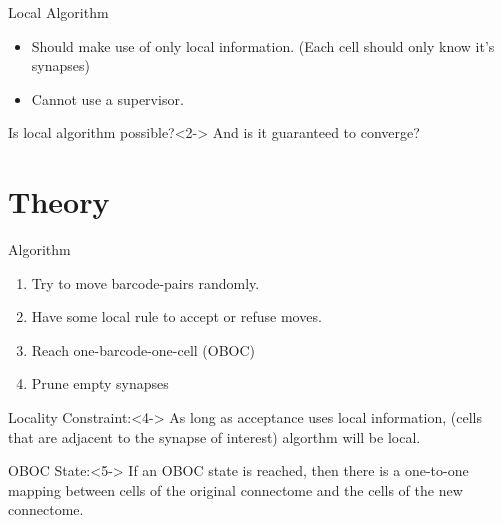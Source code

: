 \documentclass[10pt]{beamer}
\begin{document}
\begin{frame}[fragile]{Local Algorithm}
    \begin{itemize}
        \item Should make use of only local information. (Each cell should only know it's synapses)
        \item Cannot use a supervisor.
    \end{itemize}
    \begin{exampleblock}{\centering Is local algorithm possible?}<2->
        \centering
        And is it guaranteed to converge?
    \end{exampleblock}
\end{frame}




\section{Theory}

\begin{frame}[fragile]{Algorithm}
    \begin{enumerate}
        \item Try to move barcode-pairs randomly.
        \item Have some local rule to accept or refuse moves.
        \item<2-> Reach one-barcode-one-cell (OBOC)
        \item<3-> Prune empty synapses
    \end{enumerate}
    \begin{exampleblock}{Locality Constraint:}<4->
        As long as acceptance uses local information, (cells that are adjacent
        to the synapse of interest) algorthm will be local.
    \end{exampleblock}
    \begin{block}{OBOC State:}<5->
        If an OBOC state is reached, then there is a one-to-one mapping between
        cells of the original connectome and the cells of the new connectome.
    \end{block}
\end{frame}
\end{document}

